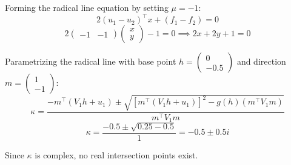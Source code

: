 \documentclass{article}
\begin{document}
Forming the radical line equation by setting $\mu = -1$:
\[
2(u_1 - u_2)^{\top}x + (f_1 - f_2) = 0
\]
\[
2\begin{pmatrix}-1 & -1\end{pmatrix}\begin{pmatrix}x\\y\end{pmatrix} - 1 = 0 \implies 2x + 2y + 1 = 0
\]

Parametrizing the radical line with base point $h = \begin{pmatrix}0\\-0.5\end{pmatrix}$ and direction $m = \begin{pmatrix}1\\-1\end{pmatrix}$:
\[
\kappa = \frac{-m^{\top}(V_1 h + u_1) \pm \sqrt{[m^{\top}(V_1 h + u_1)]^2 - g(h)(m^{\top}V_1 m)}}{m^{\top}V_1 m}
\]
\[
\kappa = \frac{-0.5 \pm \sqrt{0.25 - 0.5}}{1} = -0.5 \pm 0.5i
\]

Since $\kappa$ is complex, no real intersection points exist.
\end{document}
